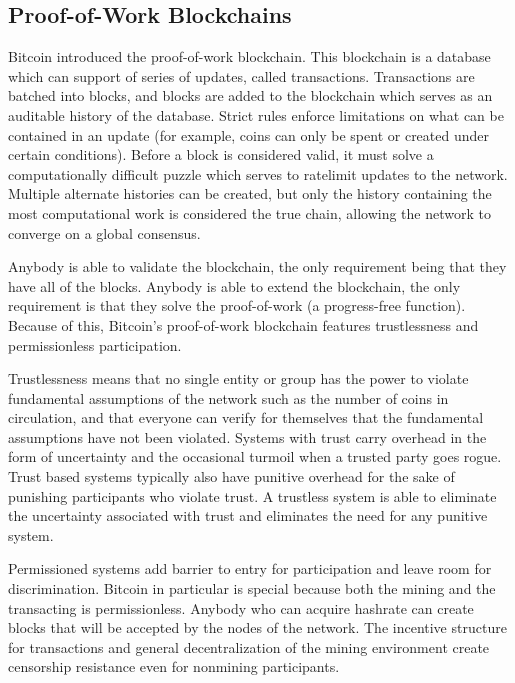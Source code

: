 \documentclass[onecolumn]{article}
\begin{document}
\subsection{Proof-of-Work Blockchains}
Bitcoin \cite{bitcoin} introduced the proof-of-work blockchain.
This blockchain is a database which can support of series of updates, called transactions.
Transactions are batched into blocks, and blocks are added to the blockchain which serves as an auditable history of the database.
Strict rules enforce limitations on what can be contained in an update (for example, coins can only be spent or created under certain conditions).
Before a block is considered valid, it must solve a computationally difficult puzzle which serves to ratelimit updates to the network.
Multiple alternate histories can be created, but only the history containing the most computational work is considered the true chain, allowing the network to converge on a global consensus.

Anybody is able to validate the blockchain, the only requirement being that they have all of the blocks.
Anybody is able to extend the blockchain, the only requirement is that they solve the proof-of-work (a progress-free function).
Because of this, Bitcoin's proof-of-work blockchain features trustlessness and permissionless participation.

Trustlessness means that no single entity or group has the power to violate fundamental assumptions of the network such as the number of coins in circulation,
and that everyone can verify for themselves that the fundamental assumptions have not been violated.
Systems with trust carry overhead in the form of uncertainty and the occasional turmoil when a trusted party goes rogue.
Trust based systems typically also have punitive overhead for the sake of punishing participants who violate trust.
A trustless system is able to eliminate the uncertainty associated with trust and eliminates the need for any punitive system.

Permissioned systems add barrier to entry for participation and leave room for discrimination.
Bitcoin in particular is special because both the mining and the transacting is permissionless.
Anybody who can acquire hashrate can create blocks that will be accepted by the nodes of the network.
The incentive structure for transactions and general decentralization of the mining environment create censorship resistance even for nonmining participants.
\end{document}
